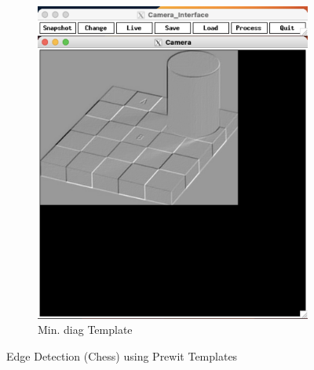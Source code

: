 \documentclass[12pt]{article}
\begin{document}
\begin{figure}
\begin{subfigure}[b]{0.475\textwidth}
		\includegraphics[width=\textwidth]{hw3_results/p1_chess_mindiag}
		\caption[]%
		{{\small Min. diag Template}}    
		\label{fig:mean and std of net44}
	\end{subfigure}
	\caption[ ]
	{\small Edge Detection (Chess) using Prewit Templates} 
	\label{fig:edge_detect}
\end{figure}
\end{document}
